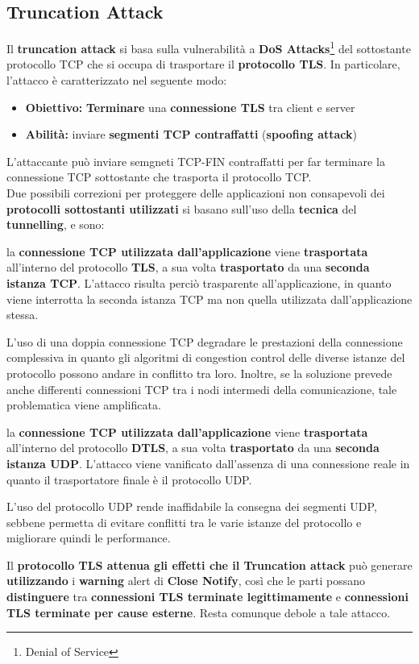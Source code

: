 \subsection{Truncation Attack}
Il \textbf{truncation attack} si basa sulla vulnerabilità a \textbf{DoS Attacks}\footnote{Denial of Service} del sottostante protocollo TCP che si occupa di trasportare il \textbf{protocollo TLS}. In particolare, l'attacco è caratterizzato nel seguente modo:
\begin{itemize}
    \item \textbf{Obiettivo:} \textbf{Terminare} una \textbf{connessione TLS} tra client e server
    \item \textbf{Abilità:} inviare \textbf{segmenti TCP contraffatti} (\textbf{spoofing attack})
\end{itemize}
L'attaccante può inviare semgneti TCP-FIN contraffatti per far terminare la connessione TCP sottostante che trasporta il protocollo TCP.\\
Due possibili correzioni per proteggere delle applicazioni non consapevoli dei \textbf{protocolli sottostanti utilizzati} si basano sull'uso della \textbf{tecnica} del \textbf{tunnelling}, e sono:
\begin{theorem}
la \textbf{connessione TCP utilizzata dall'applicazione} viene \textbf{trasportata} all'interno del protocollo \textbf{TLS}, a sua volta \textbf{trasportato} da una \textbf{seconda istanza TCP}. L'attacco risulta perciò trasparente all'applicazione, in quanto viene interrotta la seconda istanza TCP ma non quella utilizzata dall'applicazione stessa.
\end{theorem}
\begin{remark}
L’uso di una doppia connessione TCP degradare le prestazioni della connessione complessiva in quanto gli algoritmi di congestion control delle diverse istanze del protocollo possono andare in conflitto tra loro. Inoltre, se la soluzione prevede anche differenti connessioni TCP tra i nodi intermedi della comunicazione, tale problematica viene amplificata.
\end{remark}
\begin{theorem}
la \textbf{connessione TCP utilizzata dall'applicazione} viene \textbf{trasportata} all'interno del protocollo \textbf{DTLS}, a sua volta \textbf{trasportato} da una \textbf{seconda istanza UDP}. L'attacco viene vanificato dall'assenza di una connessione reale in quanto il trasportatore finale è il protocollo UDP.
\end{theorem}
\begin{remark}
L’uso del protocollo UDP rende inaffidabile la consegna dei segmenti UDP, sebbene permetta di evitare conflitti tra le varie istanze del protocollo e migliorare quindi le performance.
\end{remark}
\begin{remark}
Il \textbf{protocollo TLS attenua gli effetti che il Truncation attack} può generare \textbf{utilizzando} i \textbf{warning} alert di \textbf{Close Notify}, così che le parti possano \textbf{distinguere} tra \textbf{connessioni TLS terminate legittimamente} e \textbf{connessioni TLS terminate per cause esterne}. Resta comunque debole a tale attacco.
\end{remark}
